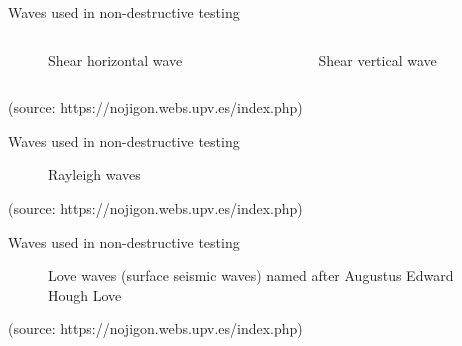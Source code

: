 \documentclass[10pt,aspectratio=169,dvipsnames]{beamer} %
\begin{document}
		\begin{frame}{Waves used in non-destructive testing}
			\begin{columns}[T]
					\begin{column}{0.5\textwidth}
							\centering
							\begin{figure}
									\caption{\alert{Shear horizontal wave}}
								\end{figure}			
						\end{column}
					\begin{column}{0.5\textwidth}
							\centering
							\begin{figure}
									\caption{\alert{Shear vertical wave}}
								\end{figure}			
						\end{column}	
				\end{columns}
		\tiny 
		(source: https://nojigon.webs.upv.es/index.php)
		\end{frame}
		\setcounter{subfigure}{0}
		\begin{frame}{Waves used in non-destructive testing}
			\begin{figure}
					\centering
					\caption{\alert{Rayleigh waves}}		
				\end{figure}			
		\tiny 
		(source: https://nojigon.webs.upv.es/index.php)
		\end{frame}
		\setcounter{subfigure}{0}
		\begin{frame}{Waves used in non-destructive testing}
			\begin{figure}			
					\centering
					\caption{\alert{Love waves} (surface seismic waves) named after Augustus Edward Hough Love}		
				\end{figure}			
		\tiny 
		(source: https://nojigon.webs.upv.es/index.php)
		\end{frame}
\end{document}
